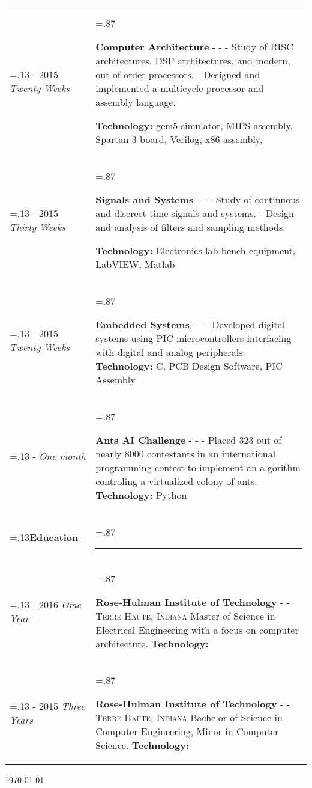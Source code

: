 \documentclass[letterpaper, 10pt]{article}
\newcommand{\timeFrame}[3] {
  \if\relax\detokenize{#2}\relax
    #1
  \else
    #1 - #2
  \fi
  \newline
  \small \textit{#3}
}
\newcommand{\entry}[5] {
  \textbf{#1}
  \if\relax\detokenize{#2}\relax
  \else
       - \textsc{#2}
  \fi
  \if\relax\detokenize{#3}\relax
  \else
      - \textsc{#3}
  \fi
  \newline #4
  \if\relax\detokenize{#5}\relax
  \else
      \newline \textbf{Technology:} #5
  \fi
  \\
}
\newcommand{\horizontalLine}[0] {
    \noindent\rule{.88\linewidth}{0.4pt}
}
\begin{document}
\begin{tabularx}{\linewidth}{>{\hsize=.13\hsize}X>{\hsize=.87\hsize}X}
\timeFrame{2012}{2015}{Twenty Weeks} &
\entry{Computer Architecture}
  {}
  {}
  {
  - Study of RISC architectures, DSP architectures, and modern, out-of-order processors. \newline
  - Designed and implemented a multicycle processor and assembly language.
  }
  {gem5 simulator, MIPS assembly, Spartan-3 board, Verilog, x86 assembly, }

\timeFrame{2012}{2015}{Thirty Weeks} &
\entry{Signals and Systems}
  {}
  {}
  {
  - Study of continuous and discreet time signals and systems. \newline
  - Design and analysis of filters and sampling methods.
  }
  {Electronics lab bench equipment, LabVIEW, Matlab}

\timeFrame{2012}{2015}{Twenty Weeks} &
\entry{Embedded Systems}
  {}
  {}
  {- Developed digital systems using PIC microcontrollers interfacing with digital and analog peripherals.}
  {C, PCB Design Software, PIC Assembly}

\timeFrame{2010}{}{One month} &
\entry{Ants AI Challenge}
  {}
  {}
  {- Placed 323 out of nearly 8000 contestants in an international programming contest to implement an algorithm controling a virtualized colony of ants.}
  {Python}

%
%
%
%

\textbf{Education} & \horizontalLine \\

\timeFrame{2015}{2016}{Ome Year} &
\entry{Rose-Hulman Institute of Technology}
  {}
  {Terre Haute, Indiana}
  {Master of Science in Electrical Engineering with a focus on computer architecture.}
  {}

\timeFrame{2012}{2015}{Three Years} &
\entry{Rose-Hulman Institute of Technology}
  {}
  {Terre Haute, Indiana}
  {Bachelor of Science in Computer Engineering, Minor in Computer Science.}
  {}

\end{tabularx}

\vfill\hfill \today
\end{document}
